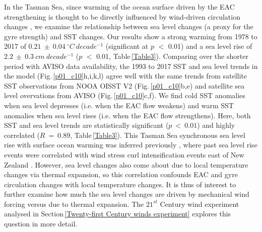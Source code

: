 \documentclass[draft,linenumbers]{agujournal2018}
\begin{document}
In the Tasman Sea, since warming of the ocean surface driven by the EAC strengthening is thought to be directly influenced by wind-driven circulation changes \citep{Hill2011,Oliver2014,Ridgway2007b,Roemmich2007,Wu2012}, we examine the relationship between sea level changes (a proxy for the gyre strength) and SST changes. Our results show a strong warming from 1978 to 2017 of $0.21\ \pm\ 0.04\ ^{\circ}C\ decade^{-1}$ (significant at $p$ $<$ 0.01) and a sea level rise of $2.2\ \pm\ 0.3\ cm\ decade^{-1}$ ($p$ $<$ 0.01, Table\,\ref{Table3}). Comparing over the shorter period with AVISO data availability, the 1993 to 2017 SST and sea level trends in the model (Fig.\,\ref{p01_c10}h,i,k,l) agree well with the same trends from satellite SST observations from NOOA OISST V2 (Fig.\,\ref{p01_c10}b,e) and satellite sea level overvations from AVISO (Fig.\,\ref{p01_c10}c,f). We find cold SST anomalies when sea level depresses (i.e. when the EAC flow weakens) and warm SST anomalies when sea level rises (i.e. when the EAC flow strengthens). Here, both SST and sea level trends are statistically significant ($p\ <\ 0.01$) and highly correlated ($R\ =\ 0.89$, Table\,\ref{Table3}). This Tasman Sea synchronous sea level rise with surface ocean warming was inferred previously \citep{Holbrook1997}, where past sea level rise events were correlated with wind stress curl intensification events east of New Zealand \citep{Roemmich2007}. However, sea level changes also come about due to local temperature changes via thermal expansion, so this correlation confounds EAC and gyre circulation changes with local temperature changes. It is thus of interest to further examine how much the sea level changes are driven by mechanical wind forcing versus due to thermal expansion. The $21^{st}$ Century wind experiment analysed in Section\,\ref{Twenty-first Century winds experiment} explores this question in more detail.
\end{document}
